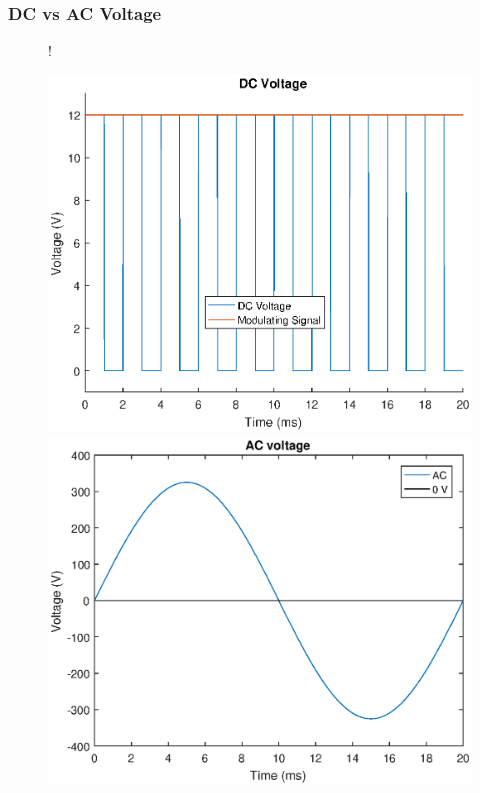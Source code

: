 \documentclass{beamer}
\begin{document}
	\begin{frame}\frametitle{DC vs AC Voltage}

		\begin{figure}
			\resizebox {\textwidth} {!} {
			  \centering
			  \begin{minipage}[b]{0.49\textwidth}
			    \includegraphics[width=\textwidth]{dc-wave.eps}
			  \end{minipage}
			  \hfill
			  \begin{minipage}[b]{0.49\textwidth}
			    \includegraphics[width=\textwidth]{ac-wave.eps}
			  \end{minipage}
			  
}
\end{figure}
\end{frame}
\end{document}
